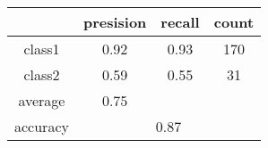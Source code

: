 
    \begin{tabular}{ | c | c | c | c | }
	\hline
	         &presision & recall & count \\ \hline
	class1   & 0.92    & 0.93  & 170 \\ \hline
	class2   & 0.59    & 0.55  & 31 \\ \hline
	average  & 0.75    &        &       \\
	\hline
	accuracy & \multicolumn{3}{c|}{0.87}\\
	\hline
    \end{tabular}